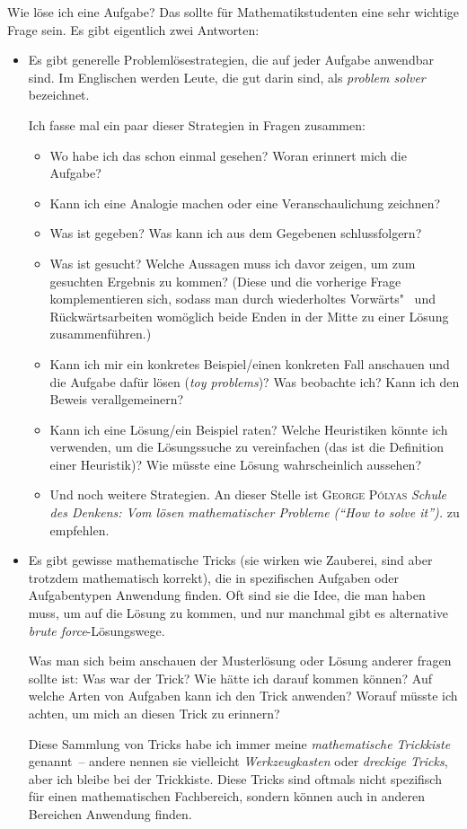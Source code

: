 \documentclass[a4paper]{article}
\begin{document}
Wie löse ich eine Aufgabe? Das sollte für Mathematikstudenten eine sehr wichtige Frage sein. Es gibt eigentlich zwei Antworten:
\begin{itemize}
    \item Es gibt generelle Problemlösestrategien, die auf jeder Aufgabe anwendbar sind. Im Englischen werden Leute, die gut darin sind, als \emph{problem solver} bezeichnet.

          Ich fasse mal ein paar dieser Strategien in Fragen zusammen:
          \begin{itemize}
              \item Wo habe ich das schon einmal gesehen? Woran erinnert mich die Aufgabe?
              \item Kann ich eine Analogie machen oder eine Veranschaulichung zeichnen?
              \item Was ist gegeben? Was kann ich aus dem Gegebenen schlussfolgern?
              \item Was ist gesucht? Welche Aussagen muss ich davor zeigen, um zum gesuchten Ergebnis zu kommen? (Diese und die vorherige Frage komplementieren sich, sodass man durch wiederholtes Vorwärts"~ und Rückwärtsarbeiten womöglich beide Enden in der Mitte zu einer Lösung zusammenführen.)
              \item Kann ich mir ein konkretes Beispiel/einen konkreten Fall anschauen und die Aufgabe dafür lösen (\emph{toy problems})? Was beobachte ich? Kann ich den Beweis verallgemeinern?
              \item Kann ich eine Lösung/ein Beispiel raten? Welche Heuristiken könnte ich verwenden, um die Lösungssuche zu vereinfachen (das ist die Definition einer Heuristik)? Wie müsste eine Lösung wahrscheinlich aussehen?
              \item Und noch weitere Strategien. An dieser Stelle ist \textsc{George Pólyas} \emph{Schule des Denkens: Vom lösen mathematischer Probleme ("`How to solve it"').} zu empfehlen.
          \end{itemize}

    \item Es gibt gewisse mathematische Tricks (sie wirken wie Zauberei, sind aber trotzdem mathematisch korrekt), die in spezifischen Aufgaben oder Aufgabentypen Anwendung finden. Oft sind sie die Idee, die man haben muss, um auf die Lösung zu kommen, und nur manchmal gibt es alternative \emph{brute force}-Lösungswege.

          Was man sich beim anschauen der Musterlösung oder Lösung anderer fragen sollte ist: Was war der Trick? Wie hätte ich darauf kommen können? Auf welche Arten von Aufgaben kann ich den Trick anwenden? Worauf müsste ich achten, um mich an diesen Trick zu erinnern?

          Diese Sammlung von Tricks habe ich immer meine \emph{mathematische Trickkiste} genannt~-- andere nennen sie vielleicht \emph{Werkzeugkasten} oder \emph{dreckige Tricks}, aber ich bleibe bei der Trickkiste. Diese Tricks sind oftmals nicht spezifisch für einen mathematischen Fachbereich, sondern können auch in anderen Bereichen Anwendung finden.
\end{itemize}
\end{document}
